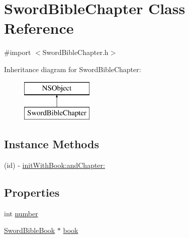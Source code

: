 \hypertarget{interface_sword_bible_chapter}{\section{Sword\-Bible\-Chapter Class Reference}
\label{interface_sword_bible_chapter}
}


{\ttfamily \#import $<$Sword\-Bible\-Chapter.\-h$>$}

Inheritance diagram for Sword\-Bible\-Chapter\-:\begin{figure}[H]
\begin{center}
\leavevmode
\includegraphics[height=2.000000cm]{interface_sword_bible_chapter}
\end{center}
\end{figure}
\subsection*{Instance Methods}
\begin{DoxyCompactItemize}
\item 
(id) -\/ \hyperlink{interface_sword_bible_chapter_a5a1a569e7b4b861e7912d9ef7175c783}{init\-With\-Book\-:and\-Chapter\-:}
\end{DoxyCompactItemize}
\subsection*{Properties}
\begin{DoxyCompactItemize}
\item 
int \hyperlink{interface_sword_bible_chapter_a7106e2abc437ad981830d14176d15f09}{number}
\item 
\hyperlink{interface_sword_bible_book}{Sword\-Bible\-Book} $\ast$ \hyperlink{interface_sword_bible_chapter_a4e9b92518a70c0ad92db854a9297870b}{book}
\end{DoxyCompactItemize}


